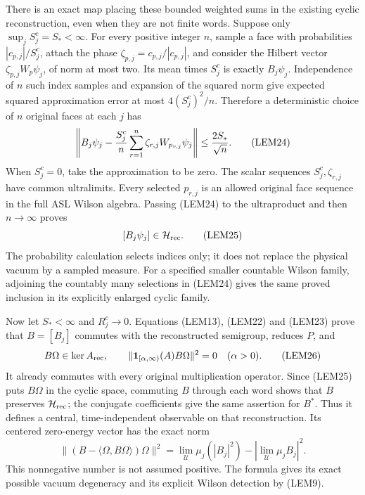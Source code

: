 \documentclass[11pt]{article}
\begin{document}
There is an exact map placing these bounded weighted sums in the existing cyclic reconstruction, even when they are not finite words. Suppose only \(\sup_jS_j^c=S_*<\infty\). For every positive integer \(n\), sample a face with probabilities \(|c_{p,j}|/S_j^c\), attach the phase \(\zeta_{p,j}=c_{p,j}/|c_{p,j}|\), and consider the Hilbert vector \(\zeta_{p,j}W_p\psi_j\), of norm at most two. Its mean times \(S_j^c\) is exactly \(B_j\psi_j\). Independence of \(n\) such index samples and expansion of the squared norm give expected squared approximation error at most \(4(S_j^c)^2/n\). Therefore a deterministic choice of \(n\) original faces at each \(j\) has
\[
 \left\|B_j\psi_j-{S_j^c\over n}\sum_{r=1}^n
                   \zeta_{r,j}W_{p_{r,j}}\psi_j\right\|
 \le {2S_*\over\sqrt n}.
 \tag{LEM24}
\]
When \(S_j^c=0\), take the approximation to be zero. The scalar sequences \(S_j^c,\zeta_{r,j}\) have common ultralimits. Every selected \(p_{r,j}\) is an allowed original face sequence in the full ASL Wilson algebra. Passing (LEM24) to the ultraproduct and then \(n\to\infty\) proves
\[
 [B_j\psi_j]\in\mathcal H_{\rm rec}.
 \tag{LEM25}
\]
The probability calculation selects indices only; it does not replace the physical vacuum by a sampled measure. For a specified smaller countable Wilson family, adjoining the countably many selections in (LEM24) gives the same proved inclusion in its explicitly enlarged cyclic family.

Now let \(S_*<\infty\) and \(R_j^c\to0\). Equations (LEM13), (LEM22) and (LEM23) prove that \(B=[B_j]\) commutes with the reconstructed semigroup, reduces \(P\), and
\[
 B\Omega\in\ker A_{\rm rec},\qquad
 \|\mathbf1_{[\alpha,\infty)}(A)B\Omega\|^2=0\quad(\alpha>0).
 \tag{LEM26}
\]
It already commutes with every original multiplication operator. Since (LEM25) puts \(B\Omega\) in the cyclic space, commuting \(B\) through each word shows that \(B\) preserves \(\mathcal H_{\rm rec}\); the conjugate coefficients give the same assertion for \(B^*\). Thus it defines a central, time-independent observable on that reconstruction. Its centered zero-energy vector has the exact norm
\[
 \|(B-\langle\Omega,B\Omega\rangle)\Omega\|^2
 =\lim_{\mathcal U}\mu_j(|B_j|^2)
       -\left|\lim_{\mathcal U}\mu_jB_j\right|^2.
 \tag{LEM27}
\]
This nonnegative number is not assumed positive. The formula gives its exact possible vacuum degeneracy and its explicit Wilson detection by (LEM9).
\end{document}
